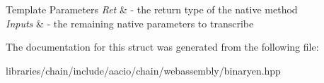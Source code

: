 \begin{DoxyTemplParams}{Template Parameters}
{\em Ret} & -\/ the return type of the native method \\
\hline
{\em Inputs} & -\/ the remaining native parameters to transcribe \\
\hline
\end{DoxyTemplParams}


The documentation for this struct was generated from the following file\+:\begin{DoxyCompactItemize}
\item 
libraries/chain/include/aacio/chain/webassembly/binaryen.\+hpp\end{DoxyCompactItemize}
